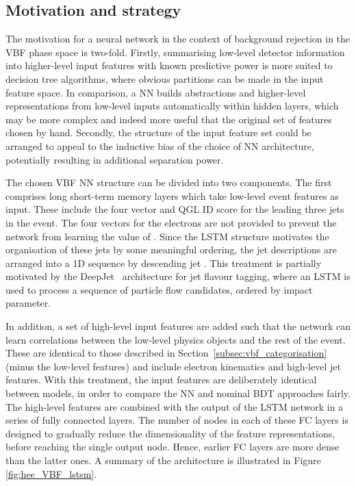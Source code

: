\subsection{Motivation and strategy}

The motivation for a neural network in the context of background rejection in the VBF phase space is two-fold. Firstly, summarising low-level detector information into higher-level input features with known predictive power is more suited to decision tree algorithms, where obvious partitions can be made in the input feature space. In comparison, a NN builds abstractions and higher-level representations from low-level inputs automatically within hidden layers, which may be more complex and indeed more useful that the original set of features chosen by hand. %
Secondly, the structure of the input feature set could be arranged to appeal to the inductive bias of the choice of NN architecture, potentially resulting in additional separation power. 

The chosen VBF NN structure can be divided into two components. The first comprises long short-term memory layers which take low-level event features as input. These include the four vector and QGL ID score for the leading three jets in the event. The four vectors for the electrons are not provided to prevent the network from learning the value of \mee. Since the LSTM structure motivates the organisation of these jets by some meaningful ordering, the jet descriptions are arranged into a 1D sequence by descending jet \pt. This treatment is partially motivated by the DeepJet~\cite{deepJet} architecture for jet flavour tagging, where an LSTM is used to process a sequence of particle flow candidates, ordered by impact parameter.

In addition, a set of high-level input features are added such that the network can learn correlations between the low-level physics objects and the rest of the event. 
These are identical to those described in Section~\ref{subsec:vbf_categorisation} (minus the low-level features) and include electron kinematics and high-level jet features.
With this treatment, the input features are deliberately identical between models, in order to compare the NN and nominal BDT approaches fairly. The high-level features are combined with the output of the LSTM network in a series of fully connected layers. The number of nodes in each of these FC layers is designed to gradually reduce the dimensionality of the feature representations, before reaching the single output node. Hence, earlier FC layers are more dense than the latter ones. A summary of the architecture is illustrated in Figure \ref{fig:hee_VBF_lstsm}. %


